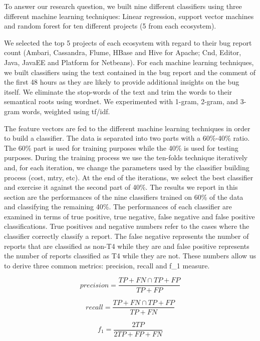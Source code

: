 \documentclass[12pt]{report}
\begin{document}
To answer our research question, we built nine different classifiers
using three different machine learning techniques: Linear regression,
support vector machines and random forest for ten different projects (5
from each ecosystem).

We selected the top 5 projects of each ecosystem with regard to their
bug report count (Ambari, Cassandra, Flume, HBase and Hive for Apache;
Cnd, Editor, Java, JavaEE and Platform for Netbeans). For each machine
learning techniques, we built classifiers using the text contained in
the bug report and the comment of the first 48 hours as they are likely
to provide additional insights on the bug itself. We eliminate the
stop-words of the text and trim the words to their semantical roots
using wordnet. We experimented with 1-gram, 2-gram, and 3-gram words,
weighted using tf/idf.

The feature vectors are fed to the different machine learning techniques
in order to build a classifier. The data is separated into two parts
with a 60\%-40\% ratio. The 60\% part is used for training purposes
while the 40\% is used for testing purposes. During the training process
we use the ten-folds technique iteratively and, for each iteration, we
change the parameters used by the classifier building process (cost,
mtry, etc). At the end of the iterations, we select the best classifier
and exercise it against the second part of 40\%. The results we report
in this section are the performances of the nine classifiers trained on
60\% of the data and classifying the remaining 40\%. The performances of
each classifier are examined in terms of true positive, true negative,
false negative and false positive classifications. True positives and
negative numbers refer to the cases where the classifier correctly
classify a report. The false negative represents the number of reports
that are classified as non-T4 while they are and false positive
represents the number of reports classified as T4 while they are not.
These numbers allow us to derive three common metrics: precision, recall
and f\_1 measure.

\begin{equation}
precision = \frac{TP+FN \cap TP+FP}{TP+FP}
\end{equation}

\begin{equation}
recall = \frac{TP+FN \cap TP+FP}{TP+FN}
\end{equation}

\begin{equation}
f_1 = \frac{2TP}{2TP + FP + FN}
\end{equation}
\end{document}
